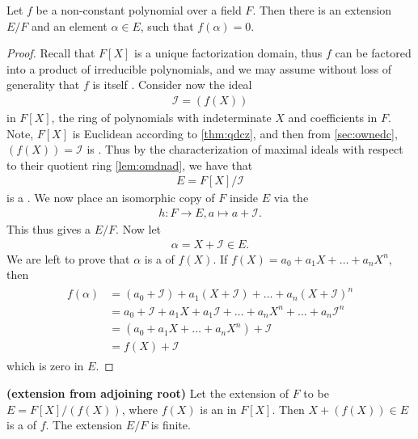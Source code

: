 \documentclass{article}
\newcommand{\bfs}[1]{\textbf{({#1}) }}
\begin{document}
\begin{thma}\label{thm:qndnarer}
Let $f$ be a non-constant polynomial over a field $F$. Then there is an extension $E / F$ and an element $\alpha \in E$,  such that $f(\alpha)=0$.
\end{thma}
\begin{proof}
Recall that $F[X]$ is a unique factorization domain, thus $f$ can be factored into a product of irreducible polynomials, and we may assume without loss of generality that $f$ is itself . Consider now the ideal
\begin{align*}
\mathcal{I}=(f(X))
\end{align*}
in $F[X]$, the ring of polynomials with indeterminate $X$ and coefficients in $F$. Note, $F[X]$ is Euclidean according to \cref{thm:qdcz}, and then from \cref{sec:ownedc}, $(f(X))=\mathcal{I}$ is . Thus by the characterization of maximal ideals  with respect to their quotient ring \cref{lem:omdnad}, we have that
\begin{align*}
E=F[X] / \mathcal{I}
\end{align*}
is a . We now place an isomorphic copy of $F$ inside $E$ via the 
\begin{align*}
h: F \rightarrow E, a \mapsto a+\mathcal{I} .
\end{align*}
This thus gives a  $E / F$. Now let
\begin{align*}
\alpha=X+\mathcal{I} \in E .
\end{align*}
We are left to prove that $\alpha$ is a  of $f(X)$. If $f(X)=a_{0}+a_{1} X+\ldots+a_{n} X^{n}$, then
\begin{align*}
\begin{aligned}
f(\alpha) &=\left(a_{0}+\mathcal{I}\right)+a_{1}(X+\mathcal{I})+\ldots+a_{n}(X+\mathcal{I})^{n} \\
&=a_{0}+\mathcal{I}+a_{1} X+a_{1} \mathcal{I}+\ldots+a_{n} X^{n}+\ldots+a_{n} \mathcal{I}^{n} \\
&=\left(a_{0}+a_{1} X+\ldots+a_{n} X^{n}\right)+\mathcal{I} \\
&=f(X)+\mathcal{I}
\end{aligned}
\end{align*}
which is zero in $E$.
\end{proof}
\begin{cora}\bfs{extension from adjoining root}\label{cor:dad}
Let the extension of $F$ to be $E=F[X]/(f(X))$, where $f(X)$ is an  in $F[X]$. Then $X+(f(X))\in E$ is a  of $f$. The extension $E/F$ is finite. 
\end{cora}
\end{document}
